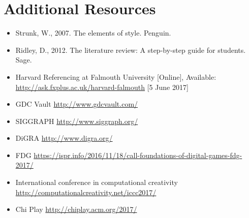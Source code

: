 \documentclass{../fal_assignment}
\begin{document}
\section*{Additional Resources}

\begin{itemize}
     \item Strunk, W., 2007. The elements of style. Penguin.
     \item Ridley, D., 2012. The literature review: A step-by-step guide for students. Sage.
     \item Harvard Referencing at Falmouth University [Online], Available: \url{http://ask.fxplus.ac.uk/harvard-falmouth} [5 June 2017]
     \item GDC Vault \url{http://www.gdcvault.com/}
     \item SIGGRAPH \url{http://www.siggraph.org/}
     \item DiGRA \url{http://www.digra.org/}
     \item FDG \url{https://ispr.info/2016/11/18/call-foundations-of-digital-games-fdg-2017/}
     \item International conference in computational creativity \url{http://computationalcreativity.net/iccc2017/}
     \item Chi Play \url{http://chiplay.acm.org/2017/}
     
    
\end{itemize}
\end{document}
